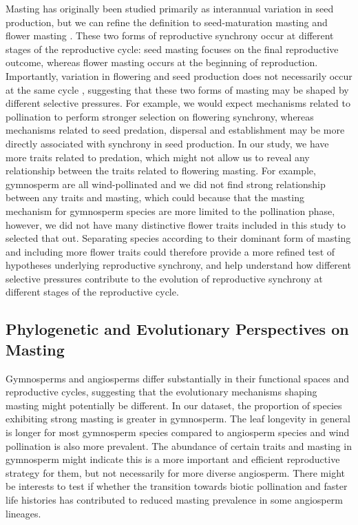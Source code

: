 \documentclass{article}
\begin{document}
Masting has originally been studied primarily as interannual variation in seed production, but we can refine the definition to seed-maturation masting and flower masting \citep{satake2021studying, pearse2016mechanisms}. These two forms of reproductive synchrony occur at different stages of the reproductive cycle: seed masting focuses on the final reproductive outcome, whereas flower masting occurs at the beginning of reproduction. Importantly, variation in flowering and seed production does not necessarily occur at the same cycle \citep{pearse2015pollen, sork1993evolutionary, isagi1997does}, suggesting that these two forms of masting may be shaped by different selective pressures. For example, we would expect mechanisms related to pollination to perform stronger selection on flowering synchrony, whereas mechanisms related to seed predation, dispersal and establishment may be more directly associated with synchrony in seed production. In our study, we have more traits related to predation, which might not allow us to reveal any relationship between the traits related to flowering masting. For example, gymnosperm are all wind-pollinated and we did not find strong relationship between any traits and masting, which could because that the masting mechanism for gymnosperm species are more limited to the pollination phase, however, we did not have many distinctive flower traits included in this study to selected that out. Separating species according to their dominant form of masting and including more flower traits could therefore provide a more refined test of hypotheses underlying reproductive synchrony, and help understand how different selective pressures contribute to the evolution of reproductive synchrony at different stages of the reproductive cycle.

\subsection{Phylogenetic and Evolutionary Perspectives on Masting} 
Gymnosperms and angiosperms differ substantially in their functional spaces and reproductive cycles, suggesting that the evolutionary mechanisms shaping masting might potentially be different. In our dataset, the proportion of species exhibiting strong masting is greater in gymnosperm. The leaf longevity in general is longer for most gymnosperm species compared to angiosperm species and wind pollination is also more prevalent. The abundance of certain traits and masting in gymnosperm might indicate this is a more important and efficient reproductive strategy for them, but not necessarily for more diverse angiosperm. There might be interests to test if whether the transition towards biotic pollination and faster life histories has contributed to reduced masting prevalence in some angiosperm lineages.
\end{document}
